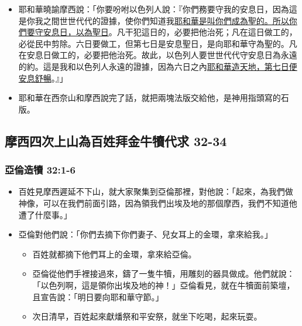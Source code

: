 \begin{table}
\begin{itemize}
\itemsep-.35em
\item 耶和華曉諭摩西說：「你要吩咐以色列人說：『你們務要守我的安息日，因為這是你我之間世世代代的證據，使你們知道我\underline{耶和華是叫你們成為聖的。所以你們要守安息日，以為聖日}。凡干犯這日的，必要把他治死；凡在這日做工的，必從民中剪除。六日要做工，但第七日是安息聖日，是向耶和華守為聖的。凡在安息日做工的，必要把他治死。故此，以色列人要世世代代守安息日為永遠的約。這是我和以色列人永遠的證據，因為六日之內\underline{耶和華造天地，第七日便安息舒暢}。』」
\item 耶和華在西奈山和摩西說完了話，就把兩塊法版交給他，是神用指頭寫的石版。
\end{itemize}

\subsection{摩西四次上山為百姓拜金牛犢代求 32-34}
\subsubsection{亞倫造犢 32:1-6}
\begin{itemize}
\itemsep-.35em
\item 百姓見摩西遲延不下山，就大家聚集到亞倫那裡，對他說：「起來，為我們做神像，可以在我們前面引路，因為領我們出埃及地的那個摩西，我們不知道他遭了什麼事。」 
\item 亞倫對他們說：「你們去摘下你們妻子、兒女耳上的金環，拿來給我。」
\begin{itemize}
\itemsep-.35em
\item 百姓就都摘下他們耳上的金環，拿來給亞倫。 
 \item 亞倫從他們手裡接過來，鑄了一隻牛犢，用雕刻的器具做成。他們就說：「以色列啊，這是領你出埃及地的神！」亞倫看見，就在牛犢面前築壇，且宣告說：「明日要向耶和華守節。」 
\item 次日清早，百姓起來獻燔祭和平安祭，就坐下吃喝，起來玩耍。
\end{itemize}
\end{itemize}


\end{table}

